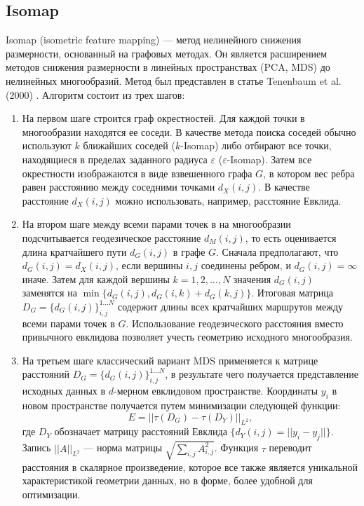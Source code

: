 \documentclass[10pt, a4paper]{extarticle}
\newcommand{\lsum}{\sum\limits}
\begin{document}
\subsection{Isomap}
Isomap (isometric feature mapping) — метод нелинейного снижения размерности, основанный на графовых методах.
Он является расширением методов снижения размерности в линейных пространствах (PCA, MDS) до нелинейных многообразий.
Метод был представлен в статье Tenenbaum et al. (2000) \cite{tenenbaum2000global}.
Алгоритм состоит из трех шагов:
\begin{enumerate}
	\item На первом шаге строится граф окрестностей. 
	Для каждой точки в многообразии находятся ее соседи.
	В качестве метода поиска соседей обычно используют $k$ ближайших соседей ($k$-Isomap) либо отбирают все точки, находящиеся в пределах заданного радиуса $\varepsilon$ ($\varepsilon$-Isomap).
	Затем все окрестности изображаются в виде взвешенного графа $G$, в котором вес ребра равен расстоянию между соседними точками $d_{X}(i,j)$. 
	В качестве расстояние $d_{X}(i,j)$ можно использовать, например, расстояние Евклида.
	\item На втором шаге между всеми парами точек в на многообразии подсчитывается геодезическое расстояние $d_{M}(i,j)$, то есть оценивается длина кратчайшего пути $d_{G}(i,j)$ в графе $G$.
	Сначала предполагают, что $d_{G}(i,j) = d_{X}(i,j)$, если вершины $i, j$ соединены ребром, и $d_{G}(i,j) = \infty$ иначе.
	Затем для каждой вершины $k = 1, 2, \ldots, N$ значения $d_{G}(i,j)$ заменятся на $\min\{d_{G}(i,j), d_{G}(i,k) + d_{G}(k,j)\}$.
	Итоговая матрица $D_G = \{d_{G}(i,j)\}_{i, j}^{1...N}$ содержит длины всех кратчайших маршрутов между всеми парами точек в $G$.
	Использование геодезического расстояния вместо привычного евклидова позволяет учесть геометрию исходного многообразия.
	\item На третьем шаге классический вариант MDS применяется к матрице расстояний $D_G = \{d_{G}(i,j)\}_{i, j}^{1...N}$, в результате чего получается представление исходных данных в $d$-мерном евклидовом пространстве.
	Координаты $y_i$ в новом пространстве получается путем минимизации следующей функции:
	\[
	E = ||\tau(D_G) - \tau(D_Y)||_{L^2},
	\]
	где $D_Y$ обозначает матрицу расстояний Евклида $\{ d_Y(i,j) = ||y_i - y_j||\}$.
	Запись $||A||_{L^2}$ — норма матрицы $\sqrt{\lsum_{i, j}A^2_{i,j}}$.
	Функция $\tau$ переводит расстояния в скалярное произведение, которое все также является уникальной характеристикой геометрии данных, но в форме, более удобной для оптимизации.
\end{enumerate}
\end{document}
